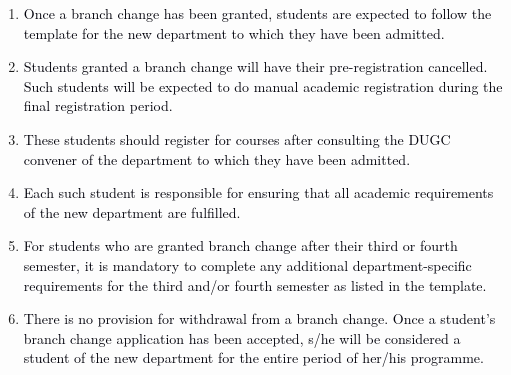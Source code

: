 \documentclass[12pt]{article}
\begin{document}
\vspace{\baselineskip}
\begin{enumerate}
	\item {\fontsize{10pt}{12.0pt}\selectfont \textcolor[HTML]{00000A}{Once a branch change has been granted, students are expected to follow the template for the new department to which they have been admitted.}\par}\par


\vspace{\baselineskip}
	\item {\fontsize{10pt}{12.0pt}\selectfont \textcolor[HTML]{00000A}{Students granted a branch change will have their pre-registration cancelled. Such students will be expected to do manual academic registration during the final registration period.}\par}\par


\vspace{\baselineskip}
	\item {\fontsize{10pt}{12.0pt}\selectfont \textcolor[HTML]{00000A}{These students should register for courses after consulting the DUGC convener of the department to which they have been admitted.}\par}\par


\vspace{\baselineskip}
	\item {\fontsize{9pt}{10.8pt}\selectfont \textcolor[HTML]{00000A}{Each such student is responsible for ensuring that all academic requirements of the new department are fulfilled.}\par}\par


\vspace{\baselineskip}
	\item {\fontsize{10pt}{12.0pt}\selectfont \textcolor[HTML]{00000A}{For students who are granted branch change after their third or fourth semester, it is mandatory to complete any additional department-specific requirements for the third and/or fourth semester as listed in the template.}\par}\par


\vspace{\baselineskip}
	\item {\fontsize{9pt}{10.8pt}\selectfont \textcolor[HTML]{00000A}{There is no provision for withdrawal from a branch change. Once a student's branch change application has been accepted, s/he will be considered a student of the new department for the entire period of her/his programme.}\par}
\end{enumerate}\par
\end{document}
